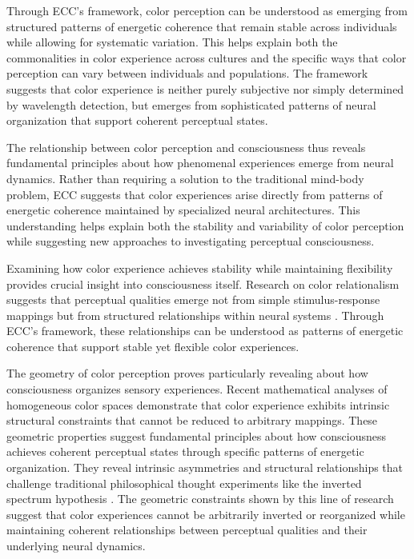 \begin{refsection}
Through ECC's framework, color perception can be understood as emerging from structured patterns of energetic coherence that remain stable across individuals while allowing for systematic variation. This helps explain both the commonalities in color experience across cultures and the specific ways that color perception can vary between individuals and populations. The framework suggests that color experience is neither purely subjective nor simply determined by wavelength detection, but emerges from sophisticated patterns of neural organization that support coherent perceptual states.

The relationship between color perception and consciousness thus reveals fundamental principles about how phenomenal experiences emerge from neural dynamics. Rather than requiring a solution to the traditional mind-body problem, ECC suggests that color experiences arise directly from patterns of energetic coherence maintained by specialized neural architectures. This understanding helps explain both the stability and variability of color perception while suggesting new approaches to investigating perceptual consciousness.

Examining how color experience achieves stability while maintaining flexibility provides crucial insight into consciousness itself. Research on color relationalism suggests that perceptual qualities emerge not from simple stimulus-response mappings but from structured relationships within neural systems \cite{ByrneHilbert2017}. Through ECC's framework, these relationships can be understood as patterns of energetic coherence that support stable yet flexible color experiences.

The geometry of color perception proves particularly revealing about how consciousness organizes sensory experiences. Recent mathematical analyses of homogeneous color spaces \cite{Provenzi2020} demonstrate that color experience exhibits intrinsic structural constraints that cannot be reduced to arbitrary mappings. These geometric properties suggest fundamental principles about how consciousness achieves coherent perceptual states through specific patterns of energetic organization. They reveal intrinsic asymmetries and structural relationships that challenge traditional philosophical thought experiments like the inverted spectrum hypothesis \cite{Block1990}. The geometric constraints shown by this line of research suggest that color experiences cannot be arbitrarily inverted or reorganized while maintaining coherent relationships between perceptual qualities and their underlying neural dynamics.


\end{refsection}
